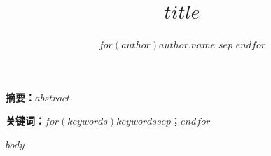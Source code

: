 \documentclass[12pt,a4paper,UTF8]{ctexart}
\title{$title$}
\author{$for(author)$$author.name$ $sep$ \quad $endfor$}
\date{}
\begin{document}
\maketitle

\begin{center}
\begin{minipage}{0.9\textwidth}
\small
\textbf{摘\quad 要：}$abstract$
\end{minipage}
\end{center}

\begin{center}
\begin{minipage}{0.9\textwidth}
\small
\textbf{关键词：}$for(keywords)$$keywords$$sep$；$endfor$
\end{minipage}
\end{center}

\newpage

$body$
\end{document}
